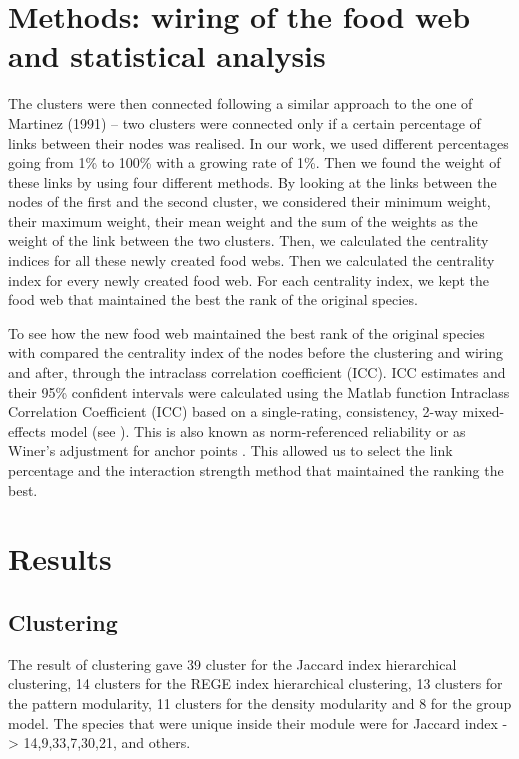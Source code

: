 \documentclass[twocolumn]{article}
\begin{document}
\section*{Methods: wiring of the food web and statistical analysis}
    The clusters were then connected following a similar approach to the one of Martinez (1991) – two clusters were connected only if a certain percentage of links between their nodes was realised. In our work, we used different percentages going from 1\% to 100\% with a growing rate of 1\%.  Then we found the weight of these links by using four different methods. By looking at the links between the nodes of the first and the second cluster, we considered their minimum weight, their maximum weight, their mean weight and the sum of the weights as the weight of the link between the two clusters. Then, we calculated the centrality indices for all these newly created food webs. Then we calculated the centrality index for every newly created food web. For each centrality index, we kept the food web that maintained the best the rank of the original species. 
    \par To see how the new food web maintained the best rank of the original species with compared the centrality index of the nodes before the clustering and wiring and after, through the intraclass correlation coefficient (ICC). ICC estimates and their 95\% confident intervals were calculated using the Matlab function Intraclass Correlation Coefficient (ICC) \citep{Salarian2021} based on a single-rating, consistency, 2-way mixed-effects model (see \citet{McGraw1996}).  This is also known as norm-referenced reliability or as Winer's adjustment for anchor points \citep{Winer1971}.
    This allowed us to select the link percentage and the interaction strength method that maintained the ranking the best.
\section*{Results}
    \subsection{Clustering}
        The result of clustering gave 39 cluster for the Jaccard index hierarchical clustering, 14 clusters for the REGE index hierarchical clustering, 13 clusters for the pattern modularity, 11 clusters for the density modularity and 8 for the group model.
        The species that were unique inside their module were for Jaccard index -> 14,9,33,7,30,21, and others.
\end{document}

